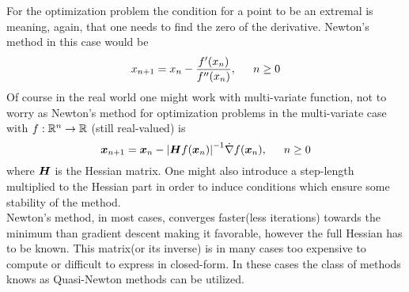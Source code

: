     For the optimization problem the condition for a point to be an extremal is
     meaning, again, that one needs to find the zero of
    the derivative. Newton's method in this case would be
        \begin{equation}
            x_{n+1} = x_n - \frac{f'(x_n)}{f''(x_n)},\indent n\geq 0
        \end{equation}
    Of course in the real world one might work with multi-variate function, not
    to worry as Newton's method for optimization problems in the multi-variate
    case with $f:\mathbb{R}^n\rightarrow\mathbb{R}$ (still real-valued) is
        \begin{equation}
            \blds{x}_{n+1} = \blds{x}_n -
            \abs{\blds{H}f(\blds{x}_n)}^{-1}\dot\nabla f(\blds{x}_n),\indent
            n\geq 0
        \end{equation}
    where $\boldsymbol{{H}}$ is the Hessian matrix. One might also introduce a
    step-length multiplied to the Hessian part in order to induce
    conditions\cite{numOptNocWrig} which ensure some stability of the method.
    \\

    Newton's method, in most cases, converges faster(less iterations) towards
    the minimum than gradient descent making it favorable, however the full
    Hessian has to be known. This matrix(or its inverse) is in many cases too
    expensive to compute or difficult to express in closed-form. In these cases
    the class of methods knows as Quasi-Newton methods can be utilized. \\

